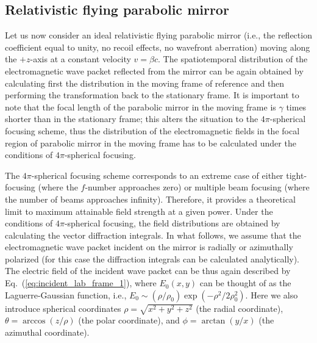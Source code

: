 \documentclass[10pt, a4paper, twoside, openright]{report}
\begin{document}
\subsection{Relativistic flying parabolic mirror}


Let us now consider an ideal relativistic flying parabolic mirror (i.e., the reflection coefficient equal to unity, no recoil effects, no wavefront aberration) moving along the $ +z $-axis at a constant velocity $ v = \beta c $. The spatiotemporal distribution of the electromagnetic wave packet reflected from the mirror can be again obtained by calculating first the distribution in the moving frame of reference and then performing the transformation back to the stationary frame. It is important to note that the focal length of the parabolic mirror in the moving frame is $ \gamma $ times shorter than in the stationary frame; this alters the situation to the $ 4 \pi $-spherical focusing scheme, thus the distribution of the electromagnetic fields in the focal region of parabolic mirror in the moving frame has to be calculated under the conditions of $ 4 \pi $-spherical focusing.

The $ 4 \pi $-spherical focusing scheme corresponds to an extreme case of either tight-focusing (where the $ f $-number approaches zero) or multiple beam focusing (where the number of beams approaches infinity). Therefore, it provides a theoretical limit to maximum attainable field strength at a given power. Under the conditions of $ 4 \pi $-spherical focusing, the field distributions are obtained by calculating the vector diffraction integrals. In what follows, we assume that the electromagnetic wave packet incident on the mirror is radially or azimuthally polarized (for this case the diffraction integrals can be calculated analytically). The electric field of the incident wave packet can be thus again described by Eq.~(\ref{eq:incident_lab_frame_1}), where $ E_0 \left(x, y \right) $ can be thought of as the Laguerre-Gaussian function, i.e., $ E_0 \sim \left( \rho / \rho_0 \right)\exp \left( - \rho^2 / 2 \rho_0^2 \right)$. Here we also introduce spherical coordinates $ \rho = \sqrt{x^2 + y^2 + z^2} $ (the radial coordinate), $ \theta = \arccos \left( z / \rho \right)$ (the polar coordinate), and $ \phi = \arctan \left( y / x \right)$ (the azimuthal coordinate).
\end{document}
